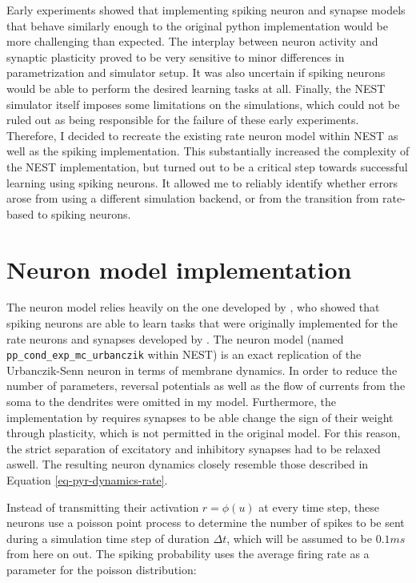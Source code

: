 Early experiments showed that implementing spiking neuron and synapse models that behave similarly enough to the
original python implementation would be more challenging than expected. The interplay between neuron activity and
synaptic plasticity proved to be very sensitive to minor differences in parametrization and simulator setup. It was also
uncertain if spiking neurons would be able to perform the desired learning tasks at all. Finally, the NEST simulator
itself imposes some limitations on the simulations, which could not be ruled out as being responsible for the failure of
these early experiments. Therefore, I decided to recreate the existing rate neuron model within NEST as well as the
spiking implementation. This substantially increased the complexity of the NEST implementation, but turned out to be a
critical step towards successful learning using spiking neurons. It allowed me to reliably identify whether errors arose
from using a different simulation backend, or from the transition from rate-based to spiking neurons.


\section{Neuron model implementation}

The neuron model relies heavily on the one developed by \cite{Stapmanns2021}, who showed that spiking neurons are able
to learn tasks that were originally implemented for the rate neurons and synapses developed by
\cite{urbanczik2014learning}. The neuron model (named \texttt{pp\_cond\_exp\_mc\_urbanczik} within NEST) is an exact
replication of the Urbanczik-Senn neuron in terms of membrane dynamics. In order to reduce the number of parameters,
reversal potentials as well as the flow of currents from the soma to the dendrites were omitted in my model.
Furthermore, the implementation by \cite{sacramento2018dendritic} requires synapses to be able change the sign of their
weight through plasticity, which is not permitted in the original model. For this reason, the strict separation of
excitatory and inhibitory synapses had to be relaxed aswell. The resulting neuron dynamics closely resemble those
described in Equation \ref{eq-pyr-dynamics-rate}.

Instead of transmitting their activation $r = \phi(u)$ at every time step, these neurons use a poisson point process to
determine the number of spikes to be sent during a simulation time step of duration $\Delta t$, which will be assumed to
be $0.1 ms$ from here on out. The spiking probability uses the average firing rate as a parameter for the poisson
distribution:

